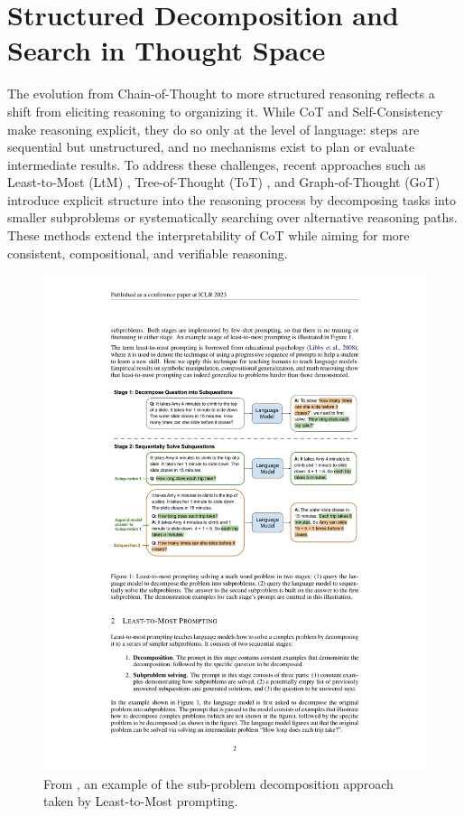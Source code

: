 \documentclass[project]{bsu-cs}  %
\begin{document}
\section{Structured Decomposition and Search in Thought Space}\label{sec:decomp}
% 
The evolution from Chain-of-Thought to more structured reasoning reflects a shift from eliciting reasoning to organizing it. While CoT and Self-Consistency make reasoning explicit, they do so only at the level of language: steps are sequential but unstructured, and no mechanisms exist to plan or evaluate intermediate results. To address these challenges, recent approaches such as Least-to-Most (LtM) \citep{zhou2023leasttomostpromptingenablescomplex}, Tree-of-Thought (ToT) \citep{yao2023treethoughtsdeliberateproblem}, and Graph-of-Thought (GoT) \citep{Besta_2024} introduce explicit structure into the reasoning process by decomposing tasks into smaller subproblems or systematically searching over alternative reasoning paths. These methods extend the interpretability of CoT while aiming for more consistent, compositional, and verifiable reasoning.

\begin{figure}
    \centering
    \includegraphics[width=0.8\linewidth]{figures/ltm1.pdf}
    \caption{From \citet{zhou2023leasttomostpromptingenablescomplex}, an example of the sub-problem decomposition approach taken by Least-to-Most prompting.}
    \label{fig:ltm1}
\end{figure}
\end{document}
